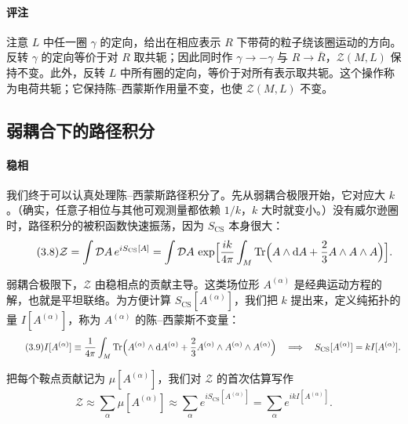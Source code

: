 \documentclass[11pt,a4paper]{article}
\newcommand{\Tr}{\operatorname{Tr}}
\newcommand{\dd}{\mathrm{d}}
\newcommand{\SCS}{S_{\mathrm{CS}}}
\begin{document}
\paragraph{评注}
注意 $L$ 中任一圈 $\gamma$ 的定向，给出在相应表示 $R$ 下带荷的粒子绕该圈运动的方向。反转 $\gamma$ 的定向等价于对 $R$ 取共轭；因此同时作 $\gamma\to-\gamma$ 与 $R\to\bar R$，$\mathcal{Z}(M,L)$ 保持不变。此外，反转 $L$ 中所有圈的定向，等价于对所有表示取共轭。这个操作称为电荷共轭；它保持陈--西蒙斯作用量不变，也使 $\mathcal{Z}(M,L)$ 不变。

\subsection{弱耦合下的路径积分}\label{sec:3.2}

\paragraph{稳相}
我们终于可以认真处理陈--西蒙斯路径积分了。先从弱耦合极限开始，它对应大 $k$。（确实，任意子相位与其他可观测量都依赖 $1/k$，$k$ 大时就变小。）没有威尔逊圈时，路径积分的被积函数快速振荡，因为 $\SCS$ 本身很大：
\begin{equation}\tag{3.8}\label{eq:3.8}
  \mathcal{Z} = \int\mathcal{D}A\,e^{i\SCS[A]}
  = \int\mathcal{D}A\,\exp\Bigl[\frac{ik}{4\pi}\int_M\Tr\Bigl(A\wedge\dd A + \frac{2}{3}A\wedge A\wedge A\Bigr)\Bigr].
\end{equation}

弱耦合极限下，$\mathcal{Z}$ 由稳相点的贡献主导。这类场位形 $A^{(\alpha)}$ 是经典运动方程的解，也就是平坦联络。为方便计算 $\SCS[A^{(\alpha)}]$，我们把 $k$ 提出来，定义纯拓扑的量 $I[A^{(\alpha)}]$，称为 $A^{(\alpha)}$ 的陈--西蒙斯不变量：
\begin{equation}\tag{3.9}\label{eq:3.9}
  I[A^{(\alpha)}] \equiv \frac{1}{4\pi}\int_M\Tr\Bigl(A^{(\alpha)}\wedge\dd A^{(\alpha)} + \frac{2}{3}A^{(\alpha)}\wedge A^{(\alpha)}\wedge A^{(\alpha)}\Bigr)
  \quad\Longrightarrow\quad \SCS[A^{(\alpha)}] = kI[A^{(\alpha)}].
\end{equation}

把每个鞍点贡献记为 $\mu[A^{(\alpha)}]$，我们对 $\mathcal{Z}$ 的首次估算写作
\begin{equation}\tag{3.10}\label{eq:3.10}
  \mathcal{Z} \approx \sum_\alpha \mu[A^{(\alpha)}] \approx \sum_\alpha e^{i\SCS[A^{(\alpha)}]} = \sum_\alpha e^{ikI[A^{(\alpha)}]}.
\end{equation}
\end{document}
